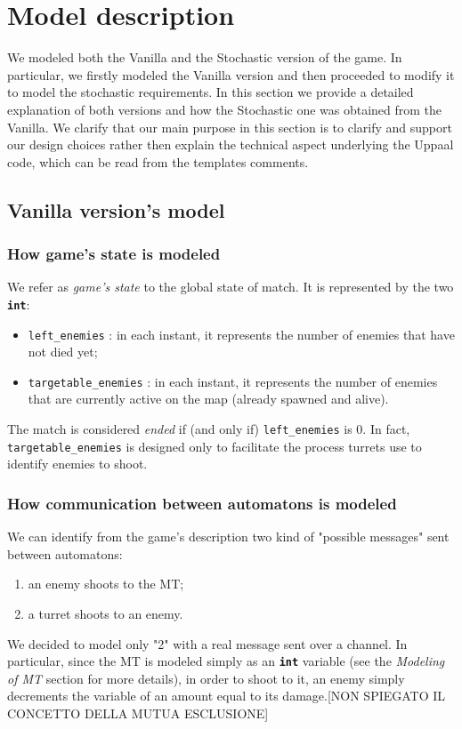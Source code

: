 \documentclass[
10pt, %
a4paper, %
oneside, %
headinclude,footinclude, %
BCOR5mm, %
]{scrartcl}
\begin{document}
	\section{Model description}
		We modeled both the Vanilla and the Stochastic version of the game. In particular, we firstly modeled the Vanilla version and then proceeded to modify it to model the stochastic requirements. In this section we provide a detailed explanation of both versions and how the Stochastic one was obtained from the Vanilla. We clarify that our main purpose in this section is to clarify and support our design choices rather then explain the technical aspect underlying the Uppaal code, which can be read from the templates comments.
	
	\subsection{Vanilla version's model}
	\subsubsection{How game's state is modeled}
	We refer as \emph{game's state} to the global state of match. It is represented by the two \texttt{\textbf{int}}:
	\begin{itemize}
		\item \texttt{left\_enemies} : in each instant, it represents the number of enemies that have not died yet;
		\item \texttt{targetable\_enemies} : in each instant, it represents the number of enemies that are currently active on the map (already spawned and alive).
	\end{itemize}
	The match is considered \emph{ended} if (and only if) \texttt{left\_enemies} is 0. In fact, \texttt{targetable\_enemies} is designed only to facilitate the process turrets use to identify enemies to shoot.
	
	\subsubsection{How communication between automatons is modeled}
	We can identify from the game's description two kind of "possible messages" sent between automatons:
	\begin{enumerate}
		\item an enemy shoots to the MT;
		\item a turret shoots to an enemy.
	\end{enumerate}
	We decided to model only "2" with a real message sent over a channel. In particular, since the MT is modeled simply as an \texttt{\textbf{int}} variable (see the \emph{Modeling of MT} section for more details), in order to shoot to it, an enemy simply decrements the variable of an amount equal to its damage.[NON SPIEGATO IL CONCETTO DELLA MUTUA ESCLUSIONE]
	
\end{document}
